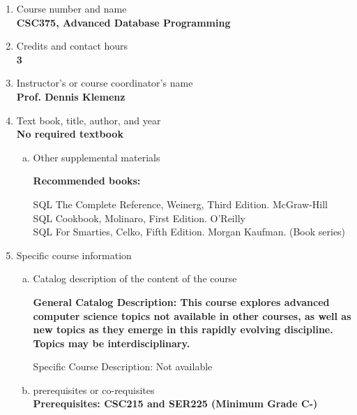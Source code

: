 \label{CSC375-DB}  %
\begin{enumerate}[1.]
\item Course number and name\\
  {\bfseries
    CSC375, Advanced Database Programming
  }

\item Credits and contact hours\\
  {\bfseries
    3
  }

\item Instructor's or course coordinator's name\\
  {\bfseries
    Prof. Dennis Klemenz
  }

\item Text book, title, author, and year\\
  {\bfseries
    No required textbook
  }
\begin{enumerate}[a.]
\item Other supplemental materials\\
  {\bfseries
    Recommended books:

    SQL The Complete Reference, Weinerg, Third Edition. McGraw-Hill\\
    SQL Cookbook, Molinaro, First Edition. O’Reilly\\
    SQL For Smarties, Celko, Fifth Edition. Morgan Kaufman. (Book series)
  }
\end{enumerate}

\item Specific course information
\begin{enumerate}[a.]
\item Catalog description of the content of the course\\
  {\bfseries
General Catalog Description: This course explores advanced computer science topics not available in other courses, as well as new topics as they emerge in this rapidly evolving discipline. Topics may be interdisciplinary.

Specific Course Description: Not available
  }

\item prerequisites or co-requisites\\
  {\bfseries
    Prerequisites: CSC215 and SER225 (Minimum Grade C-)
  }


\end{enumerate}
\end{enumerate}
